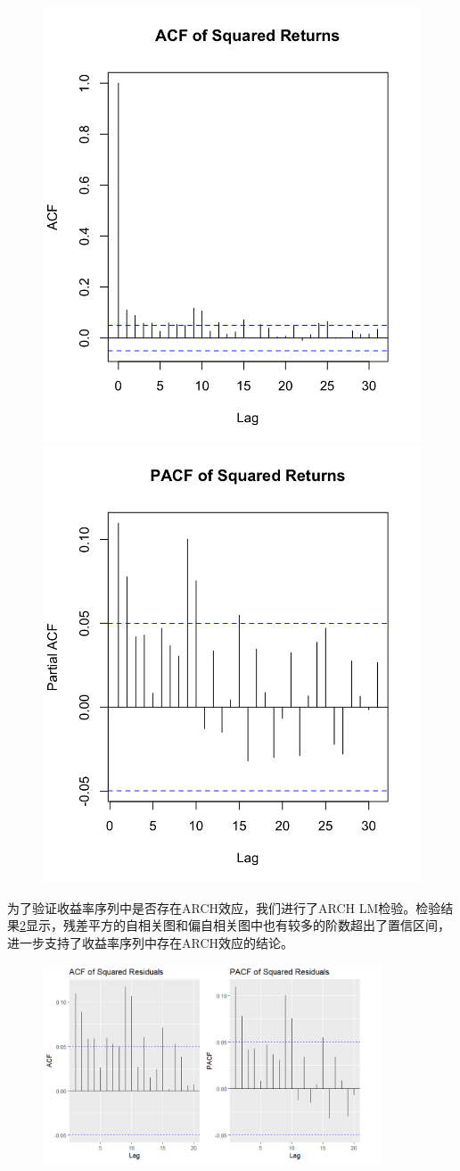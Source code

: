 \documentclass[12pt]{article}
\begin{document}
\begin{figure}[H]
\centering
{}
{\includegraphics[width=.4\textwidth]{G6.png}}
{\includegraphics[width=.4\textwidth]{G7.png}}
\caption{}\label{fig:平方ACF}
\end{figure}

为了验证收益率序列中是否存在ARCH效应，我们进行了ARCH LM检验。检验结果\ref{fig:ARCHLM}显示，残差平方的自相关图和偏自相关图中也有较多的阶数超出了置信区间，进一步支持了收益率序列中存在ARCH效应的结论。

\begin{figure}[H]
\centering
\includegraphics[width=0.9\textwidth]{GG.png}
\caption{}
\label{fig:ARCHLM}
\end{figure}
\end{document}
